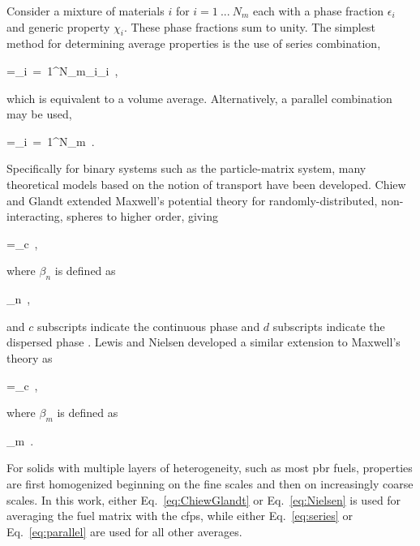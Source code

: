 
Consider a mixture of materials \(i\) for \(i=1\ ...\ N_m\) each with a phase fraction \(\epsilon_i\) and generic property \(\chi_i\). These phase fractions sum to unity. The simplest method for determining average properties is the use of series combination,

\beq
\label{eq:series}
\chi=\sum_{i\ =\ 1}^{N_m}\epsilon_i\chi_i\ ,
\eeq

\noindent which is equivalent to a volume average. Alternatively, a parallel combination may be used,

\beq
\label{eq:parallel}
=\sum_{i\ =\ 1}^{N_m}\ .
\eeq

\noindent Specifically for binary systems such as the particle-matrix system, many theoretical models based on the notion of transport have been developed. Chiew and Glandt extended Maxwell's potential theory for randomly-distributed, non-interacting, spheres \cite{progelhof} to higher order, giving

\beq
\label{eq:ChiewGlandt}
\chi=\chi_c\ ,
\eeq

\noindent where \(\beta_n\) is defined as

\beq
\label{eq:betanDef}
\beta_n\equiv{}\ ,
\eeq

\noindent and \(c\) subscripts indicate the continuous phase and \(d\) subscripts indicate the dispersed phase \cite{kamalpour,liu,gonzo,folsom}. Lewis and Nielsen developed a similar extension to Maxwell's theory as \cite{nielsen,progelhof}

\beq
\label{eq:Nielsen}
\chi=\chi_c\ ,
\eeq

\noindent where \(\beta_m\) is defined as

\beq
\label{eq:BmDef}
\beta_m\equiv{}\ .
\eeq

\noindent For solids with multiple layers of heterogeneity, such as most \gls{pbr} fuels, properties are first homogenized beginning on the fine scales and then on increasingly coarse scales. In this work, either Eq.\ \eqref{eq:ChiewGlandt} or Eq.\ \eqref{eq:Nielsen} is used for averaging the fuel matrix with the \glspl{cfp}, while either Eq.\ \eqref{eq:series} or Eq.\ \eqref{eq:parallel} are used for all other averages. 

